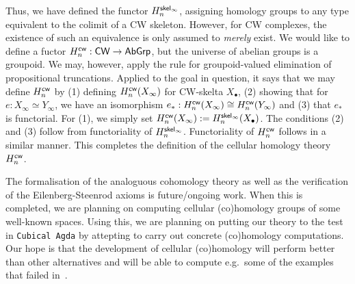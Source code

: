 \documentclass[a4page]{article}
\begin{document}
Thus, we have defined the functor $\textnormal{\ensuremath{H^{\mathsf{skel}_\infty}_{n}}}$, assigning homology groups to any type equivalent to the colimit of a CW skeleton. However, for CW complexes, the existence of such an equivalence is only assumed to \emph{merely} exist. We would like to define a fuctor $\textnormal{\ensuremath{H^{\mathsf{cw}}_{n}}} : \mathsf{CW} \to \textnormal{\ensuremath{\mathsf{AbGrp}}}$, but the universe of abelian groups is a groupoid. We may, however, apply the rule for groupoid-valued elimination of propositional truncations. Applied to the goal in question, it says that we may define $\textnormal{\ensuremath{H^{\mathsf{cw}}_{n}}}$ by (1) defining $\textnormal{\ensuremath{H^{\mathsf{cw}}_{n}}}(X_\infty)$ for CW-skelta $X_\bullet$, (2) showing that for $e : X_\infty \simeq Y_{\infty}$, we have an isomorphism $e_* : \textnormal{\ensuremath{H^{\mathsf{cw}}_{n}}}(X_\infty) \cong \textnormal{\ensuremath{H^{\mathsf{cw}}_{n}}}(Y_\infty)$ and (3) that $e_*$ is functorial. For (1), we simply set $\textnormal{\ensuremath{H^{\mathsf{cw}}_{n}}}(X_\infty) := \textnormal{\ensuremath{H^{\mathsf{skel}_\infty}_{n}}}(X_\bullet)$. The conditions (2) and (3) follow from functoriality of $\textnormal{\ensuremath{H^{\mathsf{skel}_\infty}_{n}}}$. Functoriality of $\textnormal{\ensuremath{H^{\mathsf{cw}}_{n}}}$ follows in a similar manner. This completes the definition of the cellular homology theory $\textnormal{\ensuremath{H^{\mathsf{cw}}_{n}}}$.

The formalisation of the analoguous cohomology theory as well as the verification of the Eilenberg-Steenrod axioms is future/ongoing work. When this is completed, we are planning on computing cellular (co)homology groups of some well-known spaces. Using this, we are planning on putting our theory to the test in \texttt{Cubical Agda} by attepting to carry out concrete (co)homology computations. Our hope is that the development of cellular (co)homology will perform better than other alternatives and will be able to compute e.g.\ some of the examples that failed in~\cite[Section 6]{BLM22}.

\printbibliography
\end{document}
